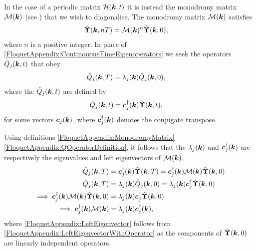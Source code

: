 In the case of a periodic matrix $\mathcal{H}(\bm{k}, t)$ it is instead the monodromy matrix $\mathcal{M}(\bm{k})$ (see ) that we wish to diagonalise. The monodromy matrix $\mathcal{M}(\bm{k})$ satisfies
\begin{align}
    \label{FloquetAppendix:MonodromyMatrix}
    \hat{\vect{\Upsilon}}(\vect{k}, nT) &= \mathcal{M}(\vect{k})^n \hat{\vect{\Upsilon}}(\vect{k}, 0),
\end{align}
where $n$ is a positive integer. In place of \eqref{FloquetAppendix:ContinouousTimeEigenoperators} we seek the operators $\hat{Q}_j(\bm{k}, t)$ that obey
\begin{align}
    \label{FloquetAppendix:QOperatorEvolution}
    \hat{Q}_j(\vect{k}, T) &= \lambda_j(\vect{k}) \hat{Q}_j(\vect{k}, 0),
\end{align}
where the $\hat{Q}_j(\bm{k}, t)$ are defined by
\begin{align}
    \label{FloquetAppendix:QOperatorDefinition}
    \hat{Q}_j(\vect{k}, t) &= \vect{c}_j^\dagger(\vect{k}) \hat{\vect{\Upsilon}}(\vect{k}, t),
\end{align}
for some vectors $\bm{c}_j(\bm{k})$, where $\bm{c}_j^\dagger(\bm{k})$ denotes the conjugate transpose. 

Using definitions \eqref{FloquetAppendix:MonodromyMatrix}--\eqref{FloquetAppendix:QOperatorDefinition}, it follows that the $\lambda_j(\bm{k})$ and $\bm{c}_j^\dagger(\bm{k})$ are respectively the eigenvalues and left eigenvectors of $\mathcal{M}(\bm{k})$,
\begin{align}
    \hat{Q}_j(\vect{k}, T) &= \vect{c}_j^\dagger(\vect{k}) \hat{\vect{\Upsilon}}(\vect{k}, T) = \vect{c}_j^\dagger(\vect{k}) \mathcal{M}(\vect{k}) \hat{\vect{\Upsilon}}(\vect{k}, 0) \\
    \hat{Q}_j(\vect{k}, T) &= \lambda_j(\vect{k}) \hat{Q}_j(\vect{k}, 0) = \lambda_j(\vect{k}) \vect{c}_j^\dagger \hat{\vect{\Upsilon}}(\vect{k}, 0)\\
    \implies \vect{c}_j^\dagger(\vect{k}) \mathcal{M}(\vect{k}) \hat{\vect{\Upsilon}}(\vect{k}, 0) &= \lambda_j(\vect{k}) \vect{c}_j^\dagger \hat{\vect{\Upsilon}}(\vect{k}, 0) \label{FloquetAppendix:LeftEigenvectorWithOperator}\\
    \implies \vect{c}_j^\dagger(\vect{k}) \mathcal{M}(\vect{k}) &= \lambda_j(\vect{k}) \vect{c}_j^\dagger(\vect{k}), \label{FloquetAppendix:LeftEigenvector}
\end{align}
where \eqref{FloquetAppendix:LeftEigenvector} follows from \eqref{FloquetAppendix:LeftEigenvectorWithOperator} as the components of $\hat{\bm{\Upsilon}}(\bm{k}, 0)$ are linearly independent operators.

